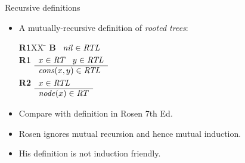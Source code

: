 \documentclass[style=sailor,size=12pt]{powerdot}
\newcommand{\id}[1]{\mbox{\it #1\/}}
\begin{document}
\begin{wideslide}[bm=,toc=]{Recursive definitions}
\begin{itemize}
\item A mutually-recursive definition of {\em rooted trees\/}:
\vspace{-1em}
\begin{tabbing}
{\bf R1}XX \=  \kill
{\bf B} \>
        \(\begin{array}[t]{l}
        \id{nil}\in\id{RTL}
        \end{array}\) \\[2ex]
{\bf R1} \>
        \(\begin{array}[t]{l}
        x\in\id{RT}\;\;\;y\in\id{RTL} \\
        \hline
        \id{cons}(x,y)\in\id{RTL}
        \end{array}\) \\[2ex]
{\bf R2} \>
        \(\begin{array}[t]{l}
        x\in\id{RTL} \\
        \hline
        \id{node}(x)\in\id{RT}
        \end{array}\)
\end{tabbing}
\item Compare with definition in Rosen 7th Ed.
\item Rosen ignores mutual recursion and hence mutual induction.
\item His definition is not induction friendly.
\end{itemize}
\end{wideslide}
\end{document}
